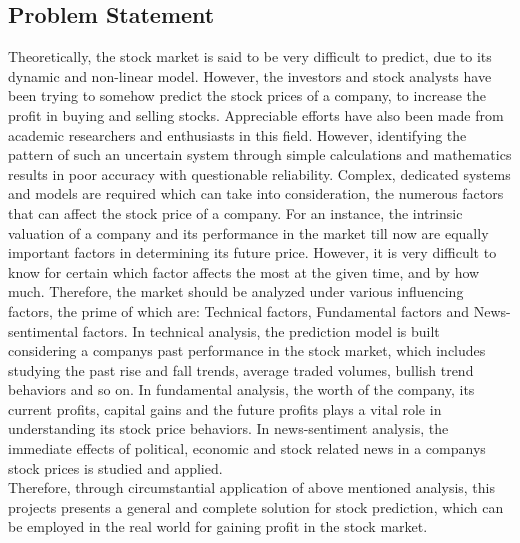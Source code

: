 \subsection{Problem Statement}
Theoretically, the stock market is said to be very difficult to predict, due to its dynamic and non-linear model. However, the investors and stock analysts have been trying to somehow predict the stock prices of a company, to increase the profit in buying and selling stocks. Appreciable efforts have also been made from academic researchers and enthusiasts in this field. However, identifying the pattern of such an uncertain system through simple calculations and mathematics results in poor accuracy with questionable reliability. Complex, dedicated systems and models are required which can take into consideration, the numerous factors that can affect the stock price of a company. For an instance, the intrinsic valuation of a company and its performance in the market till now are equally important factors in determining its future price. However, it is very difficult to know for certain which factor affects the most at the given time, and by how much. Therefore, the market should be analyzed under various influencing factors, the prime of which are: Technical factors, Fundamental factors and News-sentimental factors. In technical analysis, the prediction model is built considering a companys past performance in the stock market, which includes studying the past rise and fall trends, average traded volumes, bullish trend behaviors and so on. In fundamental analysis, the worth of the company, its current profits, capital gains and the future profits plays a vital role in understanding its stock price behaviors. In news-sentiment analysis, the immediate effects of political, economic and stock related news in a companys stock prices is studied and applied. \\

Therefore, through circumstantial application of above mentioned analysis, this projects presents a general and complete solution for stock prediction, which can be employed in the real world for gaining profit in the stock market.

